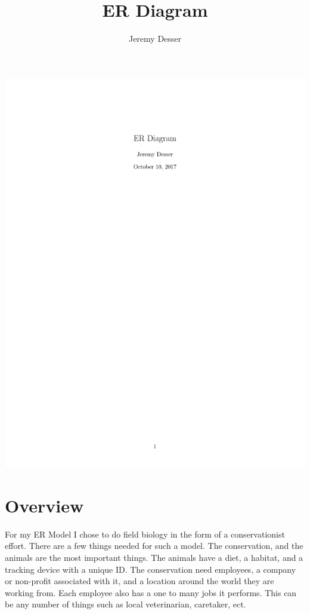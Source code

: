 \documentclass[11pt]{article}
\theoremstyle{plain}
\theoremstyle{definition}
\begin{document}
 


\title{ER Diagram}
\author{Jeremy Desser}
\begin{titlepage}
\maketitle
\end{titlepage}


\section{}
\includegraphics[scale=.9]{ErDiagram}
\section{Overview}
For my ER Model I chose to do field biology in the form of a conservationist effort. There are a few things needed for such a model. The conservation, and the animals are the most important things. The animals have a diet, a habitat, and a tracking device with a unique ID. The conservation need employees, a company or non-profit associated with it, and a location around the world they are working from. Each employee also has a one to many jobs it performs. This can be any number of things such as local veterinarian, caretaker, ect. 
\end{document}
